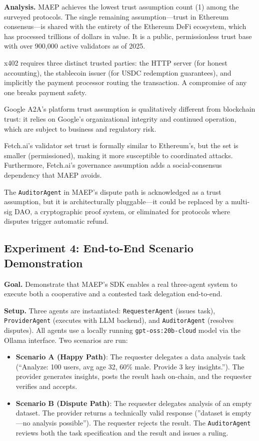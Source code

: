 \documentclass[conference]{IEEEtran}
\begin{document}
\textbf{Analysis.}
MAEP achieves the lowest trust assumption count (1) among the surveyed
protocols.  The single remaining assumption---trust in Ethereum
consensus---is shared with the entirety of the Ethereum DeFi
ecosystem, which has processed trillions of dollars in value.  It is a
public, permissionless trust base with over 900,000 active validators
as of 2025.

x402 requires three distinct trusted parties: the HTTP server (for
honest accounting), the stablecoin issuer (for USDC redemption
guarantees), and implicitly the payment processor routing the
transaction.  A compromise of any one breaks payment safety.

Google A2A's platform trust assumption is qualitatively different from
blockchain trust: it relies on Google's organizational integrity and
continued operation, which are subject to business and regulatory
risk.

Fetch.ai's validator set trust is formally similar to Ethereum's, but
the set is smaller (permissioned), making it more susceptible to
coordinated attacks.  Furthermore, Fetch.ai's governance assumption
adds a social-consensus dependency that MAEP avoids.

The \texttt{AuditorAgent} in MAEP's dispute path is acknowledged as a
trust assumption, but it is architecturally pluggable---it could be
replaced by a multi-sig DAO, a cryptographic proof system, or
eliminated for protocols where disputes trigger automatic refund.

\subsection{Experiment 4: End-to-End Scenario Demonstration}

\textbf{Goal.}
Demonstrate that MAEP's SDK enables a real three-agent system to
execute both a cooperative and a contested task delegation end-to-end.

\textbf{Setup.}
Three agents are instantiated: \texttt{RequesterAgent} (issues task),
\texttt{ProviderAgent} (executes with LLM backend), and
\texttt{AuditorAgent} (resolves disputes).  All agents use a locally
running \texttt{gpt-oss:20b-cloud} model via the Ollama interface.
Two scenarios are run:

\begin{itemize}
\item \textbf{Scenario A (Happy Path)}: The requester delegates a
  data analysis task (``Analyze: 100 users, avg age 32, 60\% male.
  Provide 3 key insights.'').  The provider generates insights, posts
  the result hash on-chain, and the requester verifies and accepts.

\item \textbf{Scenario B (Dispute Path)}: The requester delegates
  analysis of an empty dataset.  The provider returns a technically
  valid response (''dataset is empty---no analysis possible'').  The
  requester rejects the result.  The \texttt{AuditorAgent} reviews
  both the task specification and the result and issues a ruling.
\end{itemize}
\end{document}
